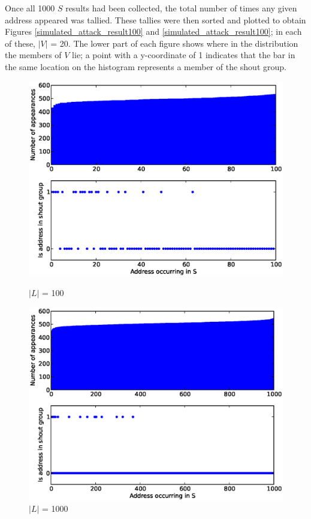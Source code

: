 \documentclass[ %
                    author={Luke Murray},
                supervisor={Dr. Simon Hollis},
                     title={Shadow Peer-to-Peer Networks},
                  subtitle={},
                    degree={MEng},
                      year={2013} ]{thesis}
\begin{document}
Once all 1000 $S$ results had been collected, the total number of times any given address appeared was tallied. These tallies were then sorted and plotted to obtain Figures \ref{simulated_attack_result100} and \ref{simulated_attack_result100}; in each of these, $|V|$ = 20. The lower part of each figure shows where in the distribution the members of $V$ lie; a point with a y-coordinate of 1 indicates that the bar in the same location on the histogram represents a member of the shout group.

\begin{figure}[h]
    \centering
    \begin{minipage}[b]{0.4\linewidth}
        \centering
        \includegraphics[width=\linewidth]{diagrams/split100.eps}
        \caption{$|L|$ = 100}
        \label{simulated_attack_result100}
    \end{minipage}
    \hspace{0.5cm}
    \begin{minipage}[b]{0.4\linewidth}
        \centering
        \includegraphics[width=\linewidth]{diagrams/split1000.eps}
        \caption{$|L|$ = 1000}
        \label{simulated_attack_result1000}
    \end{minipage}
\end{figure}
\end{document}
